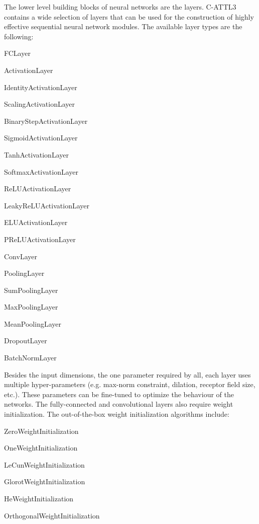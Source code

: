 The lower level building blocks of neural networks are the layers. C-\/\+A\+T\+T\+L3 contains a wide selection of layers that can be used for the construction of highly effective sequential neural network modules. The available layer types are the following\+:
\begin{DoxyItemize}
\item F\+C\+Layer
\item Activation\+Layer
\begin{DoxyItemize}
\item Identity\+Activation\+Layer
\item Scaling\+Activation\+Layer
\item Binary\+Step\+Activation\+Layer
\item Sigmoid\+Activation\+Layer
\item Tanh\+Activation\+Layer
\item Softmax\+Activation\+Layer
\item Re\+L\+U\+Activation\+Layer
\item Leaky\+Re\+L\+U\+Activation\+Layer
\item E\+L\+U\+Activation\+Layer
\item P\+Re\+L\+U\+Activation\+Layer
\end{DoxyItemize}
\item Conv\+Layer
\item Pooling\+Layer
\begin{DoxyItemize}
\item Sum\+Pooling\+Layer
\item Max\+Pooling\+Layer
\item Mean\+Pooling\+Layer
\end{DoxyItemize}
\item Dropout\+Layer
\item Batch\+Norm\+Layer
\end{DoxyItemize}

Besides the input dimensions, the one parameter required by all, each layer uses multiple hyper-\/parameters (e.\+g. max-\/norm constraint, dilation, receptor field size, etc.). These parameters can be fine-\/tuned to optimize the behaviour of the networks. The fully-\/connected and convolutional layers also require weight initialization. The out-\/of-\/the-\/box weight initialization algorithms include\+:
\begin{DoxyItemize}
\item Zero\+Weight\+Initialization
\item One\+Weight\+Initialization
\item Le\+Cun\+Weight\+Initialization
\item Glorot\+Weight\+Initialization
\item He\+Weight\+Initialization
\item Orthogonal\+Weight\+Initialization
\end{DoxyItemize}

